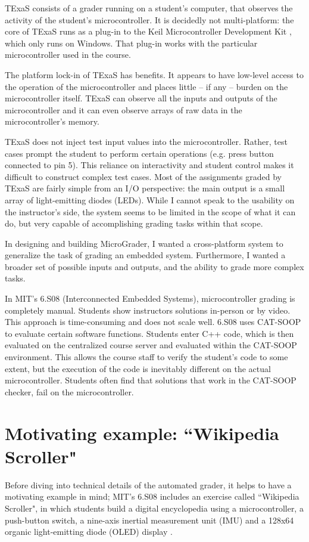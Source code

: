 \documentclass[12pt]{article}
\begin{document}
TExaS consists of a grader running on a student's computer, that observes the activity of the student's microcontroller.  It is decidedly not multi-platform: the core of TExaS runs as a plug-in to the Keil Microcontroller Development Kit \cite{keil}, which only runs on Windows.  That plug-in works with the particular microcontroller used in the course.

The platform lock-in of TExaS has benefits.  It appears to have low-level access to the operation of the microcontroller and places little -- if any -- burden on the microcontroller itself.  TExaS can observe all the inputs and outputs of the microcontroller and it can even observe arrays of raw data in the microcontroller's memory.

TExaS does not inject test input values into the microcontroller.  Rather, test cases prompt the student to perform certain operations (e.g. press button connected to pin 5).  This reliance on interactivity and student control makes it difficult to construct complex test cases.  Most of the assignments graded by TExaS are fairly simple from an I/O perspective: the main output is a small array of light-emitting diodes (LEDs).  While I cannot speak to the usability on the instructor's side, the system seems to be limited in the scope of what it can do, but very capable of accomplishing grading tasks within that scope.

In designing and building MicroGrader, I wanted a cross-platform system to generalize the task of grading an embedded system.  Furthermore, I wanted a broader set of possible inputs and outputs, and the ability to grade more complex tasks.

In MIT's 6.S08 (Interconnected Embedded Systems), microcontroller grading is completely manual.  Students show instructors solutions in-person or by video.  This approach is time-consuming and does not scale well.  6.S08 uses CAT-SOOP \cite{catsoop} to evaluate certain software functions.  Students enter C++ code, which is then evaluated on the centralized course server and evaluated within the CAT-SOOP environment.  This allows the course staff to verify the student's code to some extent, but the execution of the code is inevitably different on the actual microcontroller.  Students often find that solutions that work in the CAT-SOOP checker, fail on the microcontroller.

\newpage
\section{Motivating example: ``Wikipedia Scroller"}
\label{sec:wiki-scroller}
Before diving into technical details of the automated grader, it helps to have a motivating example in mind;  MIT's 6.S08 includes an exercise called ``Wikipedia Scroller", in which students build a digital encyclopedia using a microcontroller, a push-button switch, a nine-axis inertial measurement unit (IMU) and a 128x64 organic light-emitting diode (OLED) display \cite{wiki-scroller}.
\end{document}
